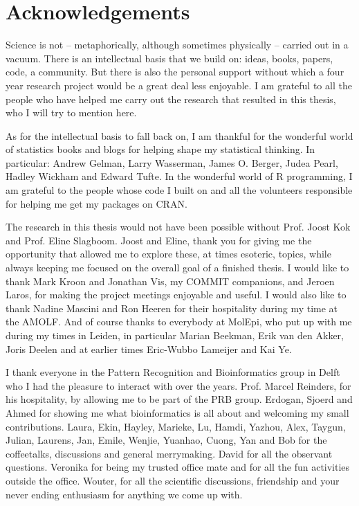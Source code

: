 \chapter{Acknowledgements}
Science is not -- metaphorically, although sometimes physically -- carried out in a vacuum. There is an intellectual basis that we build on: ideas, books, papers, code, a community. But there is also the personal support without which a four year research project would be a great deal less enjoyable. I am grateful to all the people who have helped me carry out the research that resulted in this thesis, who I will try to mention here.

As for the intellectual basis to fall back on, I am thankful for the wonderful world of statistics books and blogs for helping shape my statistical thinking. In particular: Andrew Gelman, Larry Wasserman, James O. Berger, Judea Pearl, Hadley Wickham and Edward Tufte. In the wonderful world of R programming, I am grateful to the people whose code I built on and all the volunteers responsible for helping me get my packages on CRAN. %

The research in this thesis would not have been possible without Prof. Joost Kok and Prof. Eline Slagboom. Joost and Eline, thank you for giving me the opportunity that allowed me to explore these, at times esoteric, topics, while always keeping me focused on the overall goal of a finished thesis. I would like to thank Mark Kroon and Jonathan Vis, my COMMIT companions, and Jeroen Laros, for making the project meetings enjoyable and useful. I would also like to thank Nadine Mascini and Ron Heeren for their hospitality during my time at the AMOLF. And of course thanks to everybody at MolEpi, who put up with me during my times in Leiden, in particular Marian Beekman, Erik van den Akker, Joris Deelen and at earlier times Eric-Wubbo Lameijer and Kai Ye.

I thank everyone in the Pattern Recognition and Bioinformatics group in Delft who I had the pleasure to interact with over the years. Prof. Marcel Reinders, for his hospitality, by allowing me to be part of the PRB group. Erdogan, Sjoerd and Ahmed for showing me what bioinformatics is all about and welcoming my small contributions. Laura, Ekin, Hayley, Marieke, Lu, Hamdi, Yazhou, Alex, Taygun, Julian, Laurens, Jan, Emile, Wenjie, Yuanhao, Cuong, Yan and Bob for the coffeetalks, discussions and general merrymaking. David for all the observant questions. Veronika for being my trusted office mate and for all the fun activities outside the office. Wouter, for all the scientific discussions, friendship and your never ending enthusiasm for anything we come up with.

